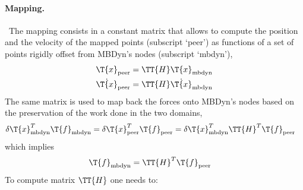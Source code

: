 \paragraph{Mapping.} \
The mapping consists in a constant matrix that allows to compute
the position and the velocity of the mapped points (subscript `peer')
as functions of a set of points rigidly offset from MBDyn's nodes
(subscript `mbdyn'),
\begin{subequations}
\begin{align}
	\T{x}_\text{peer}
	&=
	\TT{H} \T{x}_\text{mbdyn}
	\\
	\dot{\T{x}}_\text{peer}
	&=
	\TT{H} \dot{\T{x}}_\text{mbdyn}
\end{align}
\end{subequations}
The same matrix is used to map back the forces onto MBDyn's nodes
based on the preservation of the work done in the two domains,
\begin{align}
	\delta\T{x}_\text{mbdyn}^T \T{f}_\text{mbdyn}
	&=
	\delta\T{x}_\text{peer}^T \T{f}_\text{peer}
	=
	\delta\T{x}_\text{mbdyn}^T \TT{H}^T \T{f}_\text{peer}
\end{align}
which implies
\begin{align}
	\T{f}_\text{mbdyn}
	&=
	\TT{H}^T \T{f}_\text{peer}
\end{align}
To compute matrix $\TT{H}$ one needs to:
